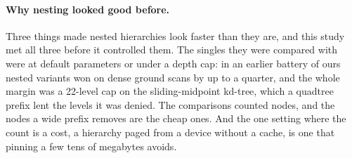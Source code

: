 \paragraph{Why nesting looked good before.} Three things made nested hierarchies look faster than they are, and this study met all three before it controlled them. The singles they were compared with were at default parameters or under a depth cap: in an earlier battery of ours nested variants won on dense ground scans by up to a quarter, and the whole margin was a 22-level cap on the sliding-midpoint kd-tree, which a quadtree prefix lent the levels it was denied. The comparisons counted nodes, and the nodes a wide prefix removes are the cheap ones. And the one setting where the count is a cost, a hierarchy paged from a device without a cache, is one that pinning a few tens of megabytes avoids.
